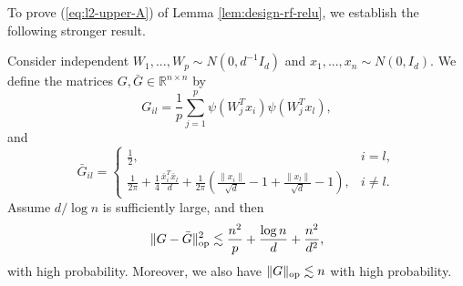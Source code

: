 To prove (\ref{eq:l2-upper-A}) of Lemma \ref{lem:design-rf-relu}, we establish the following stronger result.
\begin{lemma}\label{lem:lim-G-relu}
Consider independent $W_1,...,W_p\sim N(0,d^{-1}I_d)$ and $x_1,...,x_n\sim N(0,I_d)$. We define the matrices $G,\bar{G}\in\mathbb{R}^{n\times n}$ by
$$
G_{il}=\frac{1}{p}\sum_{j=1}^p\psi(W^T_jx_i)\psi(W_j^Tx_l),
$$
and
$$\bar{G}_{il}=\begin{cases}
\frac{1}{2}, & i=l, \\
\frac{1}{2\pi}+\frac{1}{4}\frac{\bar{x}_i^T\bar{x}_l}{d} + \frac{1}{2\pi}\left(\frac{\|x_i\|}{\sqrt{d}}-1+\frac{\|x_l\|}{\sqrt{d}}-1\right), & i\neq l.
\end{cases}$$
Assume $d/\log n$ is sufficiently large, and then
$$\|G-\bar{G}\|_{\rm op}^2\lesssim \frac{n^2}{p} + \frac{\log n}{d} + \frac{n^2}{d^2},$$
with high probability. Moreover, we also have $\|G\|_{\rm op}\lesssim n$ with high probability.
\end{lemma}

